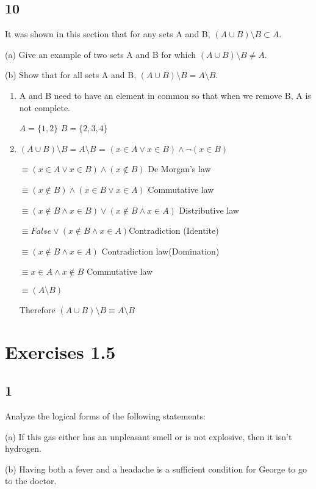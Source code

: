 \documentclass{article}
\begin{document}
\subsection{10}
It was shown in this section that for any sets A and B, $(A \cup B) \setminus B \subset A$.

(a) Give an example of two sets A and B for which $(A \cup B) \setminus B \neq A$.

(b) Show that for all sets A and B, $(A \cup B) \setminus B = A \setminus B$.

\begin{enumerate}[label=(\alph*)]
    \item 
   A and B need to have an element in common so that when we remove B, A is not complete.
   
   $A=\{1,2 \}$
   $B=\{2,3,4 \}$
   
    \item
    $(A \cup B) \setminus B = A \setminus B$ = $(x \in A \lor x \in B) \land \neg (x \in B)$ 
    
    $\equiv (x \in A \lor x \in B) \land  (x \notin B)$ De Morgan's law
    
    $\equiv (x \notin B) \land (x \in B \lor x \in A)$ Commutative law 
    
    $\equiv (x\notin B \land x \in B ) \lor (x \notin B \land x \in A)$ Distributive law
    
    $\equiv False \lor (x\notin B \land x \in A)$Contradiction (Identite)
    
    $\equiv (x\notin B \land x \in A)$ Contradiction law(Domination)
    
    $\equiv x\in A \land x \notin B$ Commutative law
    
    $\equiv (A \setminus B)$
    
    Therefore $(A \cup B) \setminus B \equiv A \setminus B$
\end{enumerate}
\section{Exercises 1.5}
\subsection{1}
Analyze the logical forms of the following statements:

(a) If this gas either has an unpleasant smell or is not explosive, then it
isn’t hydrogen.

(b) Having both a fever and a headache is a sufficient condition for
George to go to the doctor.
\end{document}
